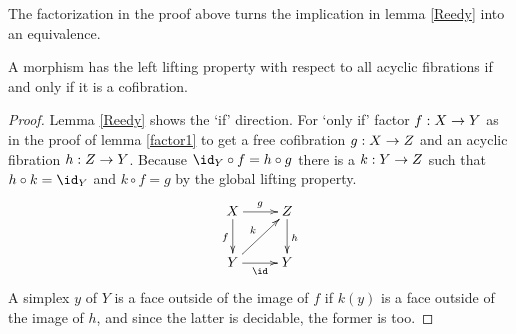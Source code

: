 \documentclass[csh.tex]{subfiles}
\begin{document}

The factorization in the proof above turns the implication in lemma \ref{Reedy} into an equivalence.

\begin{proposition} A morphism has the left lifting property with respect to all acyclic fibrations if and only if it is a cofibration. \label{cofibration characterization} \end{proposition}

\begin{proof} Lemma \ref{Reedy} shows the `if' direction. For `only if' factor $f: X\to Y$ as in the proof of lemma \ref{factor1} to get a free cofibration $g: X\to Z$ and an acyclic fibration $h: Z\to Y$. Because $\id_Y\circ f = h\circ g$ there is a $k: Y\to Z$ such that $h\circ k = \id_Y$ and $k\circ f = g$ by the global lifting property. 
\[
\xymatrix{
X\ar[d]_f \ar[r]^g & Z\ar[d]^h\\
Y\ar[r]_\id \ar[ur]^k & Y
}
\]
A simplex $y$ of $Y$ is a face outside of the image of $f$ if $k(y)$ is a face outside of the image of $h$, and since the latter is decidable, the former is too.\end{proof}
\end{document}
